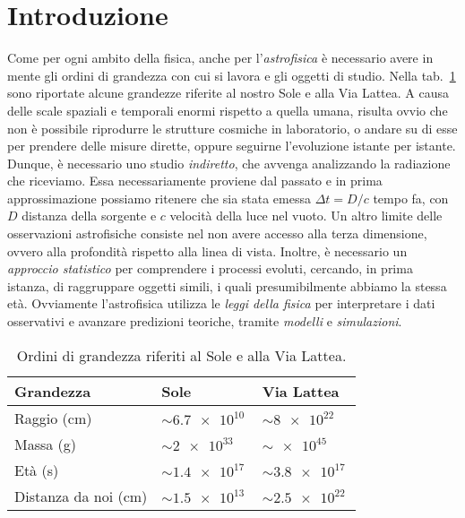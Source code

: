 \section{Introduzione}\label{sec:introduzione}
Come per ogni ambito della fisica, anche per l'\emph{astrofisica} è necessario avere in mente gli ordini di grandezza con cui si lavora e gli oggetti di studio. Nella tab.~\ref{tab:ordini-grandezza-sole-vialattea} sono riportate alcune grandezze riferite al nostro Sole e alla Via Lattea. A causa delle scale spaziali e temporali enormi rispetto a quella umana, risulta ovvio che non è possibile riprodurre le strutture cosmiche in laboratorio, o andare su di esse per prendere delle misure dirette, oppure seguirne l'evoluzione istante per istante. Dunque, è necessario uno studio \emph{indiretto}, che avvenga analizzando la radiazione che riceviamo. Essa necessariamente proviene dal passato e in prima approssimazione possiamo ritenere che sia stata emessa $\Delta t = D / c$ tempo fa, con $D$ distanza della sorgente e $c$ velocità della luce nel vuoto. Un altro limite delle osservazioni astrofisiche consiste nel non avere accesso alla terza dimensione, ovvero alla profondità rispetto alla linea di vista. Inoltre, è necessario un \emph{approccio statistico} per comprendere i processi evoluti, cercando, in prima istanza, di raggruppare oggetti simili, i quali presumibilmente abbiamo la stessa età. Ovviamente l'astrofisica utilizza le \emph{leggi della fisica} per interpretare i dati osservativi e avanzare predizioni teoriche, tramite \emph{modelli} e \emph{simulazioni}.

\begin{table}
    \caption{Ordini di grandezza riferiti al Sole e alla Via Lattea.}
    \label{tab:ordini-grandezza-sole-vialattea}
    \centering
    \begin{tabular}{lll}
    \toprule
    Grandezza & Sole & Via Lattea  \\
    \midrule
    Raggio (\si{cm}) & $\sim \SI{6.7e10}{}$ & $\sim \SI{8e22}{}$ \\
    Massa (\si{g}) & $\sim \SI{2e33}{}$    & $\sim \SI{e45}{}$    \\
    Età (\si{s}) & $\sim \SI{1.4e17}{}$  & $\sim \SI{3.8e17}{}$  \\
    Distanza da noi (\si{cm}) & $\sim \SI{1.5e13}{}$  & $\sim \SI{2.5e22}{}$  \\
    \bottomrule
    \end{tabular}
\end{table}